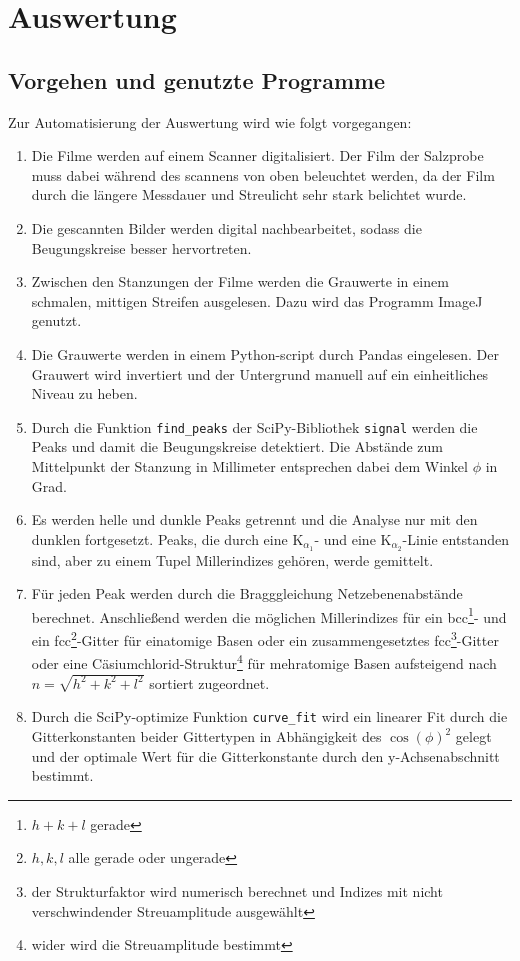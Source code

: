 \section{Auswertung}
\subsection{Vorgehen und genutzte Programme}
Zur Automatisierung der Auswertung wird wie folgt vorgegangen:
\begin{enumerate}
  \item Die Filme werden auf einem Scanner digitalisiert.
  Der Film der Salzprobe muss dabei während des scannens von oben beleuchtet werden,
  da der Film durch die längere Messdauer und Streulicht sehr stark belichtet
  wurde.
  \item Die gescannten Bilder werden digital nachbearbeitet, sodass die
  Beugungskreise besser hervortreten.
  \item Zwischen den Stanzungen der Filme werden die Grauwerte in einem schmalen,
  mittigen Streifen ausgelesen.
  Dazu wird das Programm ImageJ\cite{Schneider2012} genutzt.
  \item Die Grauwerte werden in einem Python\cite{python}-script
  durch Pandas\cite{mckinney-proc-scipy-2010} eingelesen.
  Der Grauwert wird invertiert und der Untergrund manuell auf ein
  einheitliches Niveau zu heben.
  \item Durch die Funktion \texttt{find\_peaks} der SciPy\cite{scipy}-Bibliothek
  \texttt{signal} werden die Peaks und damit die Beugungskreise detektiert.
  Die Abstände zum Mittelpunkt der Stanzung in Millimeter entsprechen dabei
  dem Winkel $\phi$ in Grad.
  \item Es werden helle und dunkle Peaks getrennt und die Analyse nur mit den dunklen
  fortgesetzt.
  Peaks, die durch eine K$_{\alpha_{1}}$- und eine K$_{\alpha_{2}}$-Linie
  entstanden sind, aber zu einem Tupel Millerindizes gehören, werde gemittelt.
  \item Für jeden Peak werden durch die Bragggleichung Netzebenenabstände
  berechnet. Anschließend werden die möglichen Millerindizes für ein bcc\footnote{$h+k+l$ gerade}-
  und ein fcc\footnote{$h, k, l$ alle gerade oder ungerade}-Gitter für einatomige
  Basen oder ein zusammengesetztes fcc\footnote{der Strukturfaktor wird numerisch berechnet
  und Indizes mit nicht verschwindender Streuamplitude ausgewählt}-Gitter oder eine Cäsiumchlorid-Struktur\footnote{
  wider wird die Streuamplitude bestimmt
  }
  für mehratomige Basen aufsteigend nach $n=\sqrt{h^{2}+k^{2}+l^{2}}$ sortiert zugeordnet.
  \item Durch die SciPy-optimize Funktion \texttt{curve\_fit} wird ein linearer
  Fit durch die Gitterkonstanten beider Gittertypen in Abhängigkeit
  des $\cos{(\phi)}^{2}$ gelegt und der optimale Wert für die Gitterkonstante
  durch den y-Achsenabschnitt bestimmt.
\end{enumerate}


